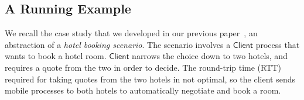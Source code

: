 \documentclass[preprint,11pt]{elsarticle}
\newcommand{\Client}{\mathsf{Client}}
\begin{document}
{{%

\subsection{A Running Example}\label{ss:hotel}
We recall the case study that we developed in our previous paper~\cite{KouzapasPY17}, an abstraction of a \emph{hotel booking scenario}.
The scenario involves a $\Client$ process that wants to book
a hotel room. %
$\Client$
narrows the choice down to two hotels, and requires 
 a quote from the two in order to
decide. The round-trip time (RTT) required for
taking quotes from the two hotels in not optimal, %
so the client sends mobile processes to both hotels
to automatically negotiate and book a room. 


}}
\end{document}
